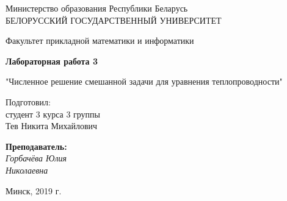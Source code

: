 \documentclass{article}%
\begin{document}
%

\begin{titlepage}
  \begin{center}
    \large
    Министерство образования Республики Беларусь\\
    \vspace{0.5cm}
    БЕЛОРУССКИЙ ГОСУДАРСТВЕННЫЙ УНИВЕРСИТЕТ
    \vspace{0.5cm}
     
    Факультет прикладной математики и информатики
\bigskip
\vfill
\vfill
\vfill
\vfill
\centerline{\Large \bf Лабораторная работа 3}
    \vspace{0.5cm}
\centerline{"Численное решение смешанной задачи для уравнения теплопроводности"}
\end{center}

\vspace*{\fill}
\vfill
\vfill
\vfill
\hfill
\begin{minipage}{0.25\textwidth}
{   Подготовил:\\ студент 3 курса 3 группы\\ Тев Никита Михайлович\\}
\end{minipage}

\mbox{}
\vfill
\hfill
\begin{minipage}{0.25\textwidth}
  {\large{\bf Преподаватель: } 
{\it\\ Горбачёва Юлия \\ Николаевна}}
\end{minipage}

\vspace*{\fill}
\vfill
\vfill
\vfill
\vfill
\vfill
\vfill
\vfill
\vfill
\vfill
\vspace*{\fill}
\begin{center}
Минск, 2019 г.
\end{center}
\end{titlepage}
\end{document}

